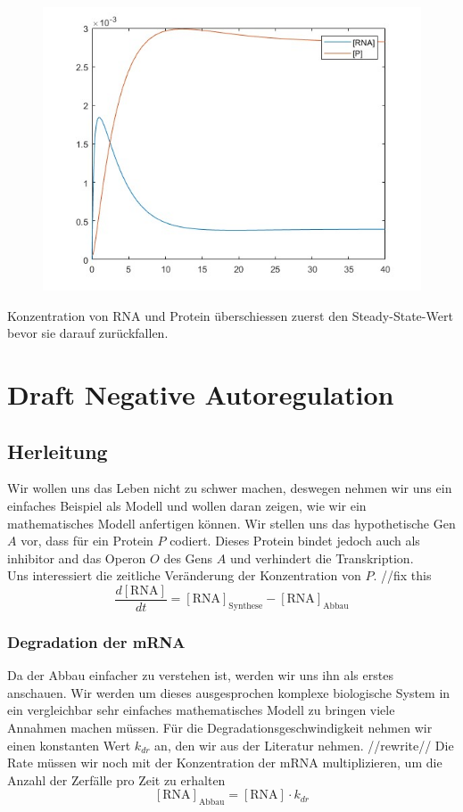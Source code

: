 \documentclass{article}
\begin{document}
\begin{figure}[h]
    \centering
    \includegraphics[width=0.8\linewidth]{images/negative_autoregulation.jpg}
\end{figure}

Konzentration von RNA und Protein überschiessen zuerst den Steady-State-Wert bevor sie darauf zurückfallen.

\newpage
\section{Draft Negative Autoregulation}
\subsection{Herleitung}
Wir wollen uns das Leben nicht zu schwer machen, deswegen nehmen wir uns ein einfaches Beispiel als Modell und wollen daran zeigen, wie wir ein mathematisches Modell anfertigen können.
Wir stellen uns das hypothetische Gen $A$ vor, dass für ein Protein $P$ codiert. Dieses Protein bindet jedoch auch als inhibitor and das Operon $O$ des Gens $A$ und verhindert die Transkription.\\
Uns interessiert die zeitliche Veränderung der Konzentration von $P$. //fix this
\begin{equation} \label{eq:1}
    \frac{d[\text{RNA}]}{dt}=[\text{RNA}]_{\text{Synthese}}-[\text{RNA}]_{\text{Abbau}}
\end{equation}
\subsubsection{Degradation der mRNA}
Da der Abbau einfacher zu verstehen ist, werden wir uns ihn als erstes anschauen. Wir werden um dieses ausgesprochen komplexe biologische System in ein vergleichbar sehr einfaches mathematisches Modell zu bringen viele Annahmen machen müssen. Für die Degradationsgeschwindigkeit nehmen wir einen konstanten Wert $k_{dr}$ an, den wir aus der Literatur\cite{lacoperon} nehmen. //rewrite// Die Rate müssen wir noch mit der Konzentration der mRNA multiplizieren, um die Anzahl der Zerfälle pro Zeit zu erhalten
\begin{equation} \label{eq:2}
    [\text{RNA}]_{\text{Abbau}}=[\text{RNA}] \cdot k_{dr}
\end{equation}
\end{document}
